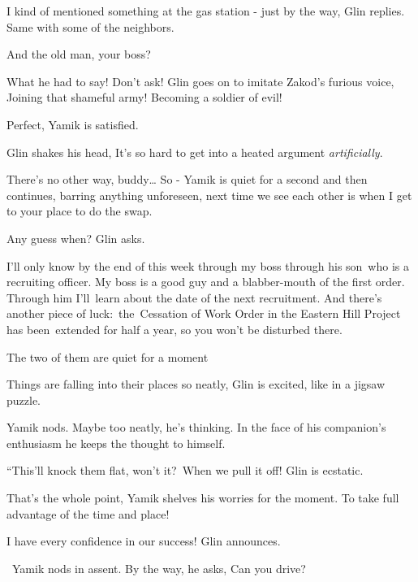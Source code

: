 \documentclass[letterpaper]{article}
\begin{document}
{\textquotedbl}I kind of mentioned something at the gas station - just by the way,{\textquotedbl} Glin replies.
{\textquotedbl}Same with some of the neighbors.{\textquotedbl} 

{\textquotedbl}And the old man, your boss?{\textquotedbl} 

{\textquotedbl}What he had to say! Don't ask!{\textquotedbl} Glin goes on to imitate Zakod's furious voice,
{\textquotedbl}Joining that shameful army! Becoming a soldier of evil!{\textquotedbl} 

{\textquotedbl}Perfect,{\textquotedbl} Yamik is satisfied. 

Glin shakes his head, {\textquotedbl}It's so hard to get into a heated argument \textit{artificially}.{\textquotedbl} 

{\textquotedbl}There's no other way, buddy{\dots} So -{\textquotedbl} Yamik is quiet for a second and then continues,
{\textquotedbl}barring anything unforeseen, next time we see each other is when I get to your place to do the
swap.{\textquotedbl} 

{\textquotedbl}Any guess when?{\textquotedbl} Glin asks. 

{\textquotedbl}I'll only know by the end of this week through my boss through his son\ who is a recruiting officer. My
boss is a good guy and a blabber-mouth of the first order. Through him I'll\ learn about the date of the next
recruitment. And there's another piece of luck:\ the\ Cessation of Work Order in the Eastern Hill Project has
been~extended for half a year, so you won't be disturbed there.{\textquotedbl}\ 

The two of them are quiet for a moment

{\textquotedbl}Things are falling into their places so neatly,{\textquotedbl} Glin is excited, {\textquotedbl}like in a
jigsaw puzzle.{\textquotedbl}

Yamik nods. Maybe too neatly, he's thinking. In the face of his companion's enthusiasm he keeps the thought to himself.

{}``This'll knock them flat, won't it?\ When we pull it off!{\textquotedbl} Glin is ecstatic.\ 

{\textquotedbl}That's the whole point,{\textquotedbl} Yamik shelves his worries for the moment. {\textquotedbl}To take
full advantage of the time and place!{\textquotedbl}

{\textquotedbl}I have every confidence in our success!{\textquotedbl} Glin announces.

~Yamik nods in assent. {\textquotedbl}By the way,{\textquotedbl} he asks, {\textquotedbl}Can you drive?{\textquotedbl}
\end{document}

